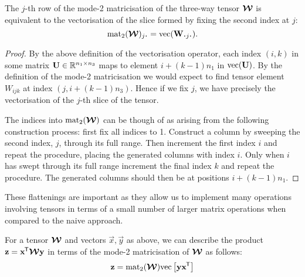 {\begin{lem}
The \(j\)-th row of the mode-2 matricisation of the three-way tensor \(\bm{\mathcal{W}}\)
is equivalent to the vectorisation of the slice formed by fixing the second index at \(j\):
\begin{equation}\label{eq:matlemstatement}
	\matr_2 (\tensor{W})_{j \midbullet} = \vect(\mat{W}_{\midbullet j \midbullet}).
\end{equation}
\label{lem:matricise}
\end{lem}
\begin{proof}
By the above definition of the vectorisation operator, each index \((i, k)\) in some matrix
\(\mathbf{U} \in \mathbb{R}^{n_1\times n_3}\) maps to element \(i + (k-1)n_1\) in
\(\operatorname{vec}(\mathbf{U})\). By the definition of the mode-2 matricisation we would expect to
find tensor element \(W_{ijk}\) at index \((j, i + (k-1)n_3)\). Hence if we fix \(j\), we have
precisely the vectorisation of the \(j\)-th slice of the tensor.

The indices into \(\operatorname{mat}_2(\bm{\mathcal{W}})\) can be though of as arising from the following construction
process: first fix all indices to 1. Construct a column by sweeping the second index, \(j\),
through its full range. Then increment the first index \(i\) and repeat the procedure, placing
the generated columns with index \(i\). Only when \(i\) has swept through its full range
increment the final index \(k\) and repeat the procedure. The generated columns should then be
at positions \(i + (k-1)n_1\).
\end{proof}

These flattenings are important as they allow us to
implement many operations involving tensors in terms of a small number of larger matrix
operations when compared to the naive approach.

\begin{lem}\label{lem:outerprod}
For a tensor \(\bm{\mathcal{W}}\) and vectors \(\vec{x}, \vec{y}\) as above,
we can describe the product \(\mathbf{z} = \mathbf{x}^{\mkern-1.5mu\mathsf{T}}\bm{\mathcal{W}}\mathbf{y}\) in terms of the
mode-2 matricisation of \(\bm{\mathcal{W}}\) as 
follows:
\begin{align}
	\mathbf{z} = \operatorname{mat}_2(\bm{\mathcal{W}})\mathrm{vec}\left[\mathbf{y}\mathbf{x}^{\mkern-1.5mu\mathsf{T}}\right]
	\label{eq:bilinearouter}
\end{align}
\end{lem}

}
